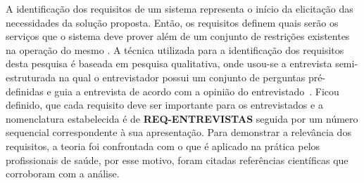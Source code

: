 A identificação dos requisitos de um sistema representa o início da elicitação das necessidades da solução proposta. Então, os requisitos definem quais serão os serviços que o sistema deve prover além de um conjunto de restrições existentes na operação do mesmo \cite{sommerville2011}. A técnica utilizada para a identificação dos requisitos desta pesquisa é baseada em pesquisa qualitativa, onde usou-se a entrevista semi-estruturada na qual o entrevistador possui um conjunto de perguntas pré-definidas e guia a entrevista de acordo com a opinião do entrevistado~\cite{FLI04}. Ficou definido, que cada requisito deve ser importante para os entrevistados e a nomenclatura estabelecida é de \textbf{REQ-ENTREVISTAS} seguida por um número sequencial correspondente à sua apresentação. Para demonstrar a relevância dos requisitos, a teoria foi confrontada com o que é aplicado na prática pelos profissionais de saúde, por esse motivo, foram citadas referências científicas que corroboram com a análise. 




